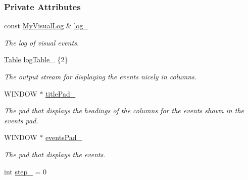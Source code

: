 \subsubsection*{Private Attributes}
\begin{DoxyCompactItemize}
\item 
const \hyperlink{structLogWindow_aac475b6f939a800e22ca9431bade9245}{My\+Visual\+Log} \& \hyperlink{structLogWindow_a270f4197635e8ece7786f21cafd1122e}{log\+\_\+}\hypertarget{structLogWindow_a270f4197635e8ece7786f21cafd1122e}{}\label{structLogWindow_a270f4197635e8ece7786f21cafd1122e}

\begin{DoxyCompactList}\small\item\em The log of visual events. \end{DoxyCompactList}\item 
\hyperlink{structTable}{Table} \hyperlink{structLogWindow_a2f03b51edefe14b61ccac3c5c1f16e10}{log\+Table\+\_\+} \{2\}\hypertarget{structLogWindow_a2f03b51edefe14b61ccac3c5c1f16e10}{}\label{structLogWindow_a2f03b51edefe14b61ccac3c5c1f16e10}

\begin{DoxyCompactList}\small\item\em The output stream for displaying the events nicely in columns. \end{DoxyCompactList}\item 
W\+I\+N\+D\+OW $\ast$ \hyperlink{structLogWindow_ad677190f0c6731969936762eb12dab2a}{title\+Pad\+\_\+}\hypertarget{structLogWindow_ad677190f0c6731969936762eb12dab2a}{}\label{structLogWindow_ad677190f0c6731969936762eb12dab2a}

\begin{DoxyCompactList}\small\item\em The pad that displays the headings of the columns for the events shown in the events pad. \end{DoxyCompactList}\item 
W\+I\+N\+D\+OW $\ast$ \hyperlink{structLogWindow_a9548d980199d36d6c16b5f936df43ad4}{events\+Pad\+\_\+}\hypertarget{structLogWindow_a9548d980199d36d6c16b5f936df43ad4}{}\label{structLogWindow_a9548d980199d36d6c16b5f936df43ad4}

\begin{DoxyCompactList}\small\item\em The pad that displays the events. \end{DoxyCompactList}\item 
int \hyperlink{structLogWindow_ae51b7c6d045662c56427b8b45cb0678d}{step\+\_\+} = 0\hypertarget{structLogWindow_ae51b7c6d045662c56427b8b45cb0678d}{}\label{structLogWindow_ae51b7c6d045662c56427b8b45cb0678d}


\end{DoxyCompactItemize}
